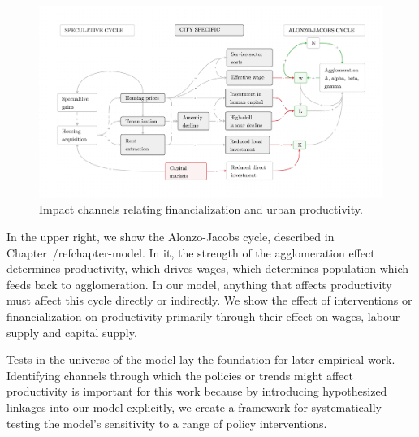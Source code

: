 \begin{figure}[h!tb]\label{fig-impact-channels}
\begin{adjustwidth}{-0.24\textwidth}{-0.24\textwidth}
\centering
\includegraphics[scale=.15 ]{fig/impact-channels.png}%
\end{adjustwidth}
\caption{Impact channels relating financialization and urban productivity.}
\end{figure}


In the upper right, we show the \gls{Alonzo-Jacobs cycle}, described in Chapter~/ref{chapter-model}. In it, the strength of the agglomeration effect determines productivity, which drives wages, which determines population which feeds back to agglomeration. In our model, anything that affects productivity must affect this cycle directly or indirectly.  We show the effect of interventions or financialization on productivity primarily through their effect on wages, labour supply and capital supply. %

Tests in the universe of the model lay the foundation for later empirical work. Identifying channels through which the policies or trends might affect productivity is important for this work because by introducing hypothesized linkages into our model explicitly, we create a framework for systematically  testing the model's sensitivity to a range of policy interventions.  %

